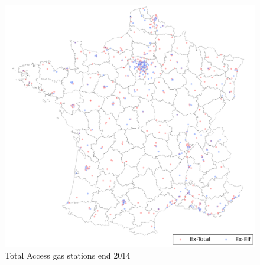 \documentclass[english]{article}
\begin{document}
\begin{figure}[H]
	\centering
		\includegraphics[width=16cm]{graphs/map_ta_adj.png}
	\floatfoot{}
\caption{Total Access gas stations end 2014}
\label{figure:map_ta}
\end{figure}
\end{document}
